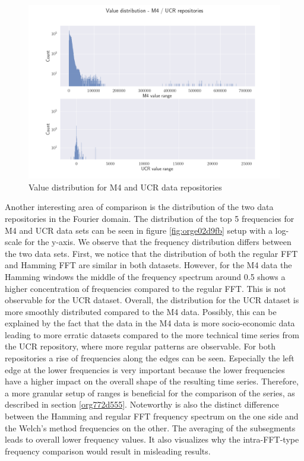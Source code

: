 \documentclass[phd,black, hidelinks]{PrincetonThesis}
\begin{document}
\begin{figure}[htbp]
\centering
\includegraphics[width=.9\linewidth]{./img/m4_ucr_val_hist.png}
\caption{\label{fig:org753dac7}Value distribution for M4 and UCR data repositories}
\end{figure}

Another interesting area of comparison is the distribution of the two data repositories in the Fourier domain. The distribution of the top 5 frequencies for M4 and UCR data sets can be seen in figure \ref{fig:orge02d9fb} setup with a log-scale for the y-axis. We observe that the frequency distribution differs between the two data sets. First, we notice that the distribution of both the regular FFT and Hamming FFT are similar in both datasets. However, for the M4 data the Hamming windows the middle of the frequency spectrum around 0.5 shows a higher concentration of frequencies compared to the regular FFT. This is not observable for the UCR dataset. Overall, the distribution for the UCR dataset is more smoothly distributed compared to the M4 data. Possibly, this can be explained by the fact that the data in the M4 data is more socio-economic data leading to more erratic datasets compared to the more technical time series from the UCR repository, where more regular patterns are observable. For both repositories a rise of frequencies along the edges can be seen. Especially the left edge at the lower frequencies is very important because the lower frequencies have a higher impact on the overall shape of the resulting time series. Therefore, a more granular setup of ranges is beneficial for the comparison of the series, as described in section \ref{org772d555}. Noteworthy is also the distinct difference between the Hamming and regular FFT frequency spectrum on the one side and the Welch's method frequencies on the other. The averaging of the subsegments leads to overall lower frequency values. It also visualizes why the intra-FFT-type frequency comparison would result in misleading results.
\end{document}
